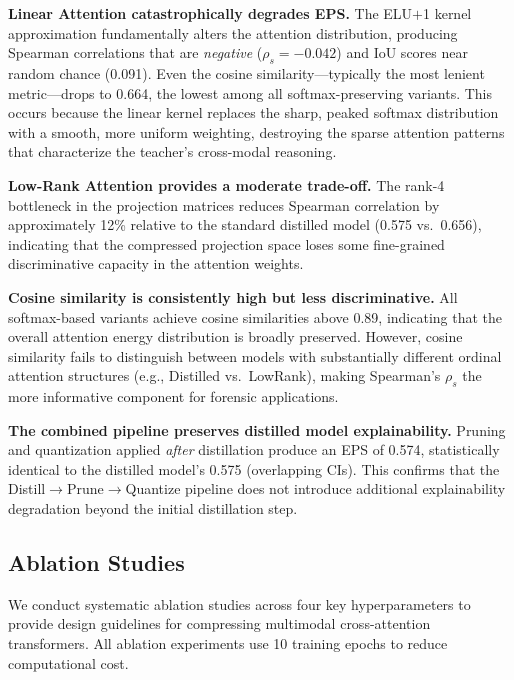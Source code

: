 \documentclass[lettersize,journal]{IEEEtran}
\begin{document}
\textbf{Linear Attention catastrophically degrades EPS.} The ELU$+$1 kernel approximation fundamentally alters the attention distribution, producing Spearman correlations that are \emph{negative} ($\rho_s = -0.042$) and IoU scores near random chance (0.091). Even the cosine similarity---typically the most lenient metric---drops to 0.664, the lowest among all softmax-preserving variants. This occurs because the linear kernel replaces the sharp, peaked softmax distribution with a smooth, more uniform weighting, destroying the sparse attention patterns that characterize the teacher's cross-modal reasoning.

\textbf{Low-Rank Attention provides a moderate trade-off.} The rank-4 bottleneck in the projection matrices reduces Spearman correlation by approximately 12\% relative to the standard distilled model (0.575 vs.\ 0.656), indicating that the compressed projection space loses some fine-grained discriminative capacity in the attention weights.

\textbf{Cosine similarity is consistently high but less discriminative.} All softmax-based variants achieve cosine similarities above 0.89, indicating that the overall attention energy distribution is broadly preserved. However, cosine similarity fails to distinguish between models with substantially different ordinal attention structures (e.g., Distilled vs.\ LowRank), making Spearman's $\rho_s$ the more informative component for forensic applications.

\textbf{The combined pipeline preserves distilled model explainability.} Pruning and quantization applied \emph{after} distillation produce an EPS of 0.574, statistically identical to the distilled model's 0.575 (overlapping CIs). This confirms that the Distill$\rightarrow$Prune$\rightarrow$Quantize pipeline does not introduce additional explainability degradation beyond the initial distillation step.


\subsection{Ablation Studies}
\label{sec:ablation}

We conduct systematic ablation studies across four key hyperparameters to provide design guidelines for compressing multimodal cross-attention transformers. All ablation experiments use 10 training epochs to reduce computational cost.
\end{document}
